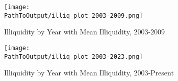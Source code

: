 \documentclass{article}
\newcommand*{\PathToOutput}{../output/}%
\begin{document}
\begin{figure}[hbt!]
\centering
\caption{Illiquidity by Year with Mean Illiquidity, 2003-2009}
  \centering
  \texttt{[image: \\PathToOutput/illiq\_plot\_2003-2009.png]}

\label{fig:illiq_plot_2003-2009}
\end{figure}


\begin{figure}[hbt!]
\centering
\caption{Illiquidity by Year with Mean Illiquidity, 2003-Present}
  \centering
  \texttt{[image: \\PathToOutput/illiq\_plot\_2003-2023.png]}

\label{fig:illiq_plot_2003-2023}
\end{figure}
\end{document}

